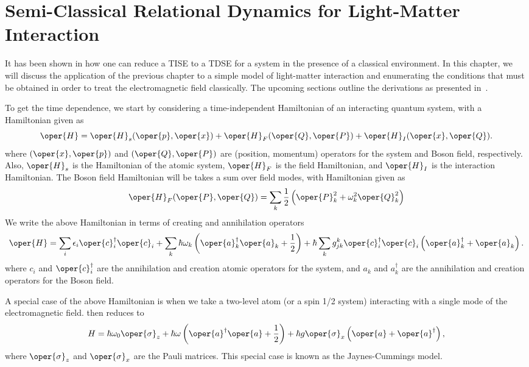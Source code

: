 \chapter{Semi-Classical Relational Dynamics for Light-Matter Interaction
\label{chap:braun_briggs_jaynes}}

It has been shown in  how one can reduce a TISE 
to a TDSE for a system in the presence of a classical environment. In this chapter, 
we will discuss the application of the previous chapter to a simple model of light-matter 
interaction and enumerating the conditions that must be obtained in order to treat the 
electromagnetic field classically. The upcoming sections outline the derivations as presented 
in~\cite{braun2004classical}. 

To get the time dependence, we start by considering a time-independent Hamiltonian of an interacting quantum system,
with a Hamiltonian given as
\begin{equation}
    \oper{H} = \oper{H}_s(\oper{p}, \oper{x}) + \oper{H}_F(\oper{Q}, \oper{P}) + \oper{H}_I(\oper{x}, \oper{Q}). 
\end{equation}
where $(\oper{x}, \oper{p})$ and $(\oper{Q}, \oper{P})$ are (position, momentum) operators for the system and Boson field, respectively. 
Also, $\oper{H}_s$ is the Hamiltonian of the atomic system, $\oper{H}_F$ is the field Hamiltonian, and $\oper{H}_I$ is the interaction Hamiltonian. 
The Boson field Hamiltonian will be takes a sum over field modes, with Hamiltonian given as 
\begin{equation}
   \oper{H}_F(\oper{P}, \oper{Q}) = \sum_{k} \frac{1}{2}\left(\oper{P}_k ^2 + \omega_k^2 \oper{Q}_k^2\right)
\end{equation}
We write the above Hamiltonian in terms of creating and annihilation operators
\begin{equation}
    \label{eq:class_jcm_eq1}
    \oper{H} = \sum_i \epsilon_i \oper{c}^\dagger _i \oper{c}_i + \sum_k \hbar \omega_k \left(\oper{a}^\dagger _k \oper{a}_k 
    + \frac{1}{2}\right) + \hbar\sum_k  g_{jk}^k \oper{c}^\dagger _i \oper{c}_i\left(\oper{a}^\dagger _k + \oper{a}_k \right).
\end{equation}
where $c_i$ and $\oper{c}^\dagger _i$ are the annihilation and creation atomic operators for the system, 
and $a_k$ and $a^\dagger _k$ are the annihilation and creation operators for the Boson field.

A special case of the above Hamiltonian is when we take a two-level atom (or a spin 1/2 system)
interacting with a single mode of the electromagnetic field.  then reduces to
\begin{eqnarray}
    \label{eq:class_jcm_eq2}
    H = {\hbar \omega_0}\oper{\sigma}_z + \hbar \omega \left(\oper{a}^\dagger \oper{a} + \frac{1}{2}\right) 
    + \hbar g \oper{\sigma}_x\left(\oper{a} + \oper{a}^\dagger\right),
\end{eqnarray}
where $\oper{\sigma}_z$ and $\oper{\sigma}_x$ are the Pauli matrices. 
This special case is known as the Jaynes-Cummings model.
